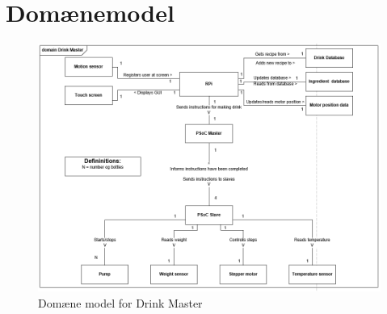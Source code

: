 \section{Domænemodel}

\begin{figure}[H]
	\centering
	\includegraphics[width=1\textwidth]{Images/domainModel.png}
	\caption{Domæne model for Drink Master}
	\label{fig:domain}
\end{figure}